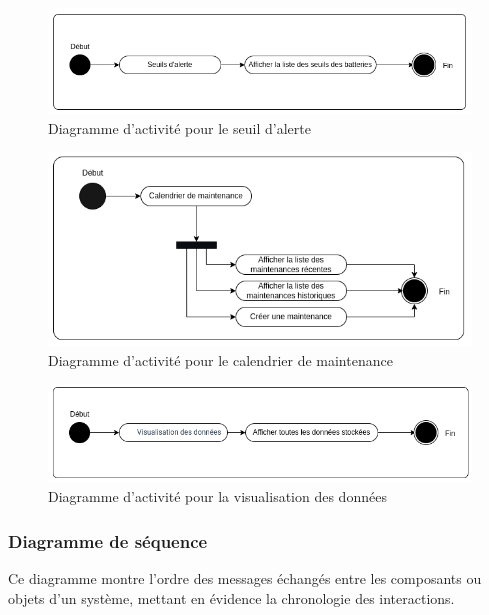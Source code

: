 \begin{figure}[H]
	\centering
	\includegraphics[width=16cm]{./img/composants/diagramme/Activiter-seuilesAlerte.png}
	\caption{Diagramme d'activité pour le seuil d'alerte}
\end{figure}

\begin{figure}[H]
	\centering
	\includegraphics[width=16cm]{./img/composants/diagramme/Activiter-calendrier.png}
	\caption{Diagramme d'activité pour le calendrier de maintenance}
\end{figure}

\begin{figure}[H]
	\centering
	\includegraphics[width=16cm]{./img/composants/diagramme/Activiter-visualisation.png}
	\caption{Diagramme d'activité pour la visualisation des données}
\end{figure}








\subsubsection{Diagramme de séquence}
Ce diagramme montre l'ordre des messages échangés entre les composants ou objets d’un système, mettant en évidence la chronologie des interactions.

